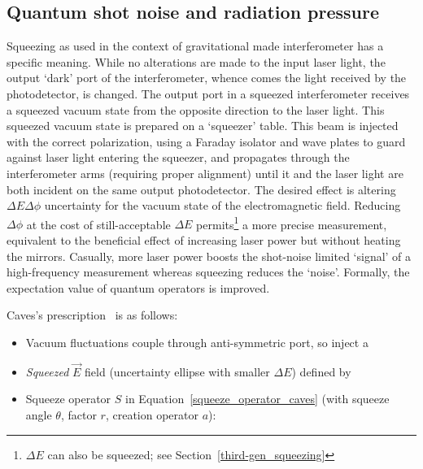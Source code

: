         \subsection{Quantum shot noise and radiation pressure}
        \label{quantum_noise}




Squeezing as used in the context of gravitational made interferometer has a specific meaning.
While no alterations are made to the input laser light, the output `dark' port of the interferometer, whence comes the light received by the photodetector, is changed.
The output port in a squeezed interferometer receives a squeezed vacuum state from the opposite direction to the laser light.
This squeezed vacuum state is prepared on a `squeezer' table.
This beam is injected with the correct polarization, using a Faraday isolator and wave plates to guard against laser light entering the squeezer, and propagates through the interferometer arms (requiring proper alignment) until it and the laser light are both incident on the same output photodetector.
The desired effect is altering $\Delta E\Delta\phi$ uncertainty for the vacuum state of the electromagnetic field.
Reducing $\Delta \phi$ at the cost of still-acceptable $\Delta E$ permits\footnote{$\Delta E$ can also be squeezed; see Section~\ref{third-gen_squeezing}} a more precise measurement, equivalent to the beneficial effect of increasing laser power but without heating the mirrors.
Casually, more laser power boosts the shot-noise limited `signal' of a high-frequency measurement whereas squeezing reduces the `noise'. 
Formally, the expectation value of quantum operators is improved.


Caves's prescription~\cite{Caves1981} is as follows:
\begin{itemize}
\item Vacuum fluctuations couple through anti-symmetric port, so inject a
\item \emph{Squeezed } $\overrightarrow{E}$ field (uncertainty ellipse with smaller $\Delta E$) defined by
\item Squeeze operator $S$ in Equation~\ref{squeeze_operator_caves} (with squeeze angle $\theta$, factor $r$, creation operator $a$):
\end{itemize}

